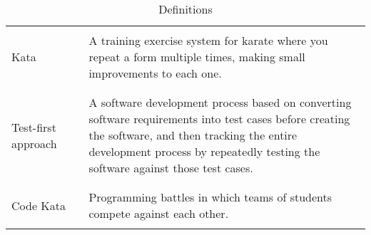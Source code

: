 \begin{table}[H]
\begin{tabular}{l l p{10cm}}
                            &        &                                                                                                                              \\\hline & & \\
        Kata                & \vline & A training exercise system for karate where you repeat a form multiple times, making small improvements to each one.         \\
                            &        &                                                                                                                              \\\hline & & \\
        Test-first approach & \vline & A software development process based on converting software requirements into test cases before creating the software, 
                                       and then tracking the entire development process by repeatedly testing the software against those test cases.                \\
                            &        &                                                                                                                              \\\hline & & \\
        Code Kata           & \vline & Programming battles in which teams of students compete against each other.                                                   \\
                            &        &                                                                                                                              \\
        \hline
    \end{tabular}
    \caption{Definitions}
\end{table}

